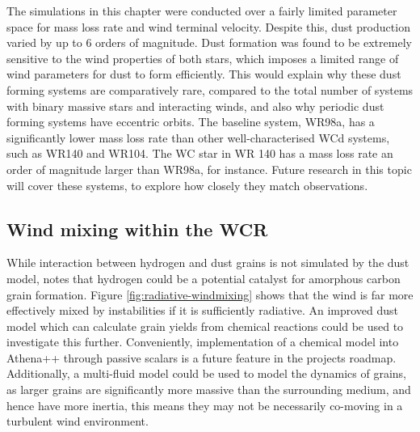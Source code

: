 \documentclass[fleqn,usenatbib]{mnras}
\begin{document}
The simulations in this chapter were conducted over a fairly limited parameter space for mass loss rate and wind terminal velocity.
Despite this, dust production varied by up to 6 orders of magnitude.
Dust formation was found to be extremely sensitive to the wind properties of both stars, which imposes a limited range of wind parameters for dust to form efficiently.
This would explain why these dust forming systems are comparatively rare, compared to the total number of systems with binary massive stars and interacting winds, and also why periodic dust forming systems have eccentric orbits.
The baseline system, WR98a, has a significantly lower mass loss rate than other well-characterised WCd systems, such as WR140 and WR104.
The WC star in WR 140 has a mass loss rate an order of magnitude larger than WR98a, for instance.
Future research in this topic will cover these systems,
to explore how closely they match observations.

\subsection{Wind mixing within the WCR}

While interaction between hydrogen and dust grains is not simulated by the dust model, \cite{leteuffModelDustFormation2002} notes that hydrogen could be a potential catalyst for amorphous carbon grain formation.
Figure \ref{fig:radiative-windmixing} shows that the wind is far more effectively mixed by instabilities if it is sufficiently radiative.
An improved dust model which can calculate grain yields from chemical reactions could be used to investigate this further.
Conveniently, implementation of a chemical model into Athena++ through passive scalars is a future feature in the projects roadmap.
Additionally, a multi-fluid model could be used to model the dynamics of grains, as larger grains are significantly more massive than the surrounding medium, and hence have more inertia, this means they may not be necessarily co-moving in a turbulent wind environment.
\end{document}
